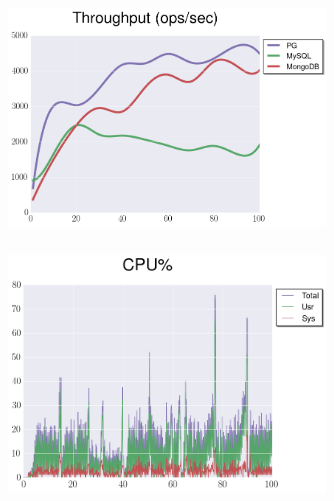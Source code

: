 \documentclass[usenames,dvipsnames, 18pt, compress, aspectratio=169]{beamer}
\begin{document}
\begin{frame}
    \frametitle{}
    \begin{center}
    \begin{figure}
        \includegraphics[width=0.75\textwidth,center]{benchmarks/insert_throughput_journaled2.png}
    \end{figure}
    \end{center}
\end{frame}

\begin{frame}
    \frametitle{}
    \begin{center}
    \begin{figure}
        \includegraphics[width=0.75\textwidth,center]{benchmarks/mongodb_update_cpu_usage.png}
    \end{figure}
    \end{center}
\end{frame}
\end{document}

